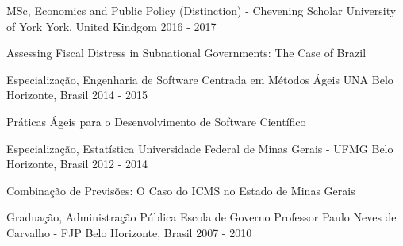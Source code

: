 \begin{cventries}
  \cventry
    {MSc, Economics and Public Policy (Distinction) - Chevening Scholar}
    {University of York}
    {York, United Kindgom}
    {2016 - 2017}
    {
      \begin{cvitems}
        \item {Assessing Fiscal Distress in Subnational Governments: The Case of Brazil}
      \end{cvitems}
    }
  \cventry
    {Especialização, Engenharia de Software Centrada em Métodos Ágeis}
    {UNA}
    {Belo Horizonte, Brasil}
    {2014 - 2015}
    {
      \begin{cvitems}
        \item {Práticas Ágeis para o Desenvolvimento de Software Científico}
      \end{cvitems}
    }
  \cventry
    {Especialização, Estatística}
    {Universidade Federal de Minas Gerais - UFMG}
    {Belo Horizonte, Brasil}
    {2012 - 2014}
    {
      \begin{cvitems}
        \item {Combinação de Previsões: O Caso do ICMS no Estado de Minas Gerais}
      \end{cvitems}
    }
  \cventry
    {Graduação, Administração Pública}
    {Escola de Governo Professor Paulo Neves de Carvalho - FJP}
    {Belo Horizonte, Brasil}
    {2007 - 2010}
    {
      \begin{cvitems}
      \end{cvitems}
    }
\end{cventries}
